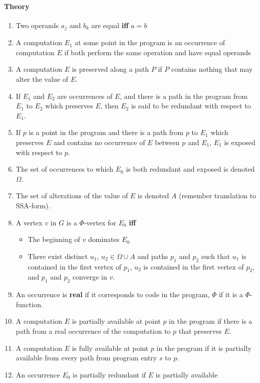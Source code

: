 \documentclass[a4paper,12pt, notitlepage]{article}
\renewcommand{\iff}{\textbf{ iff }}
\begin{document}
\paragraph*{Theory}
\begin{enumerate}
\item Two operands $a_j$ and $b_k$ are equal \iff $a = b$
\item A computation $E_1$ at some point in the program is an occurrence of
computation $E$ if both perform the same operation and have equal operands
\item A computation $E$ is preserved along a path $P$ if $P$ contains nothing
that may alter the value of $E$.
\item If $E_1$ and $E_2$ are occurrences of $E$, and there is a path in the
program from $E_1$ to $E_2$ which preserves $E$, then $E_2$ is said to be
redundant with respect to $E_1$.
\item If $p$ is a point in the program and there is a path from $p$ to $E_1$
which preserves $E$ and contains no occurrence of $E$ between $p$ and $E_1$, 
$E_1$ is exposed with respect to $p$.
\item The set of occurrences to which $E_0$ is both redundant and exposed is
denoted $\Omega$.
\item The set of alterations of the value of $E$ is denoted $A$ (remember
        translation to SSA-form).
\item A vertex $v$ in $G$ is a $\Phi$-vertex for $E_0$ \iff
    \begin{itemize}
        \item The beginning of $v$ dominates $E_0$
        \item There exist distinct $u_1$, $u_2 \in \Omega \cup A$ and paths $p_1$ 
        and $p_2$ such that $u_1$ is contained in the first vertex of $p_1$, 
        $u_2$ is contained in the first vertex of $p_2$, and $p_1$ and $p_2$
        converge in $v$.
    \end{itemize}
\item An occurrence is \textbf{real} if it corresponds to code in the program,
    $\Phi$ if it is a $\Phi$-function.
\item A computation $E$ is partially available at point $p$ in the program if
there is a path from a real occurrence of the computation to $p$ that preserves
$E$.
\item A computation $E$ is fully available at point $p$ in the program if it is
partially available from every path from program entry $s$ to $p$.
\item An occurrence $E_0$ is partially redundant if $E$ is partially available

\end{enumerate}
\end{document}
